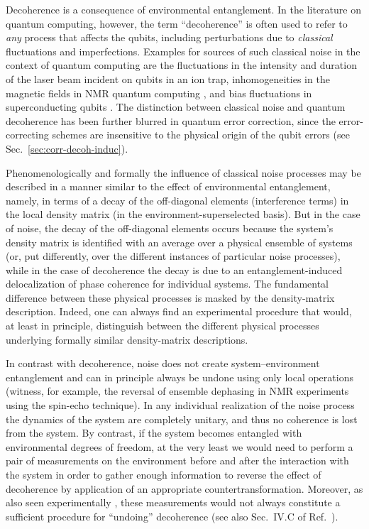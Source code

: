 \documentclass[aps,pra,reprint,amsmath,amssymb,showpacs,nofootinbib,floatfix,onecolumn,12pt]{revtex4-1}
\begin{document}
Decoherence is a consequence of environmental entanglement. In the literature on quantum computing, however, the term ``decoherence'' is often used to refer to \emph{any} process that affects the qubits, including perturbations due to \emph{classical} fluctuations and imperfections. Examples for sources of such classical noise in the context of quantum computing are the fluctuations in the intensity \cite{Schneider:1998:yz} and duration \cite{Miquel:1997:zz} of the laser beam incident on qubits in an ion trap, inhomogeneities in the magnetic fields in NMR quantum computing \cite{Vandersypen:2004:ra}, and bias fluctuations in superconducting qubits \cite{Martinis:2003:bz}. The distinction between classical noise and quantum decoherence has been further blurred in quantum error correction, since the error-correcting schemes are insensitive to the physical origin of the qubit errors (see Sec.~\ref{sec:corr-decoh-induc}).

Phenomenologically and formally the influence of classical noise processes may be described in a manner similar to the effect of environmental entanglement, namely, in terms of a decay of the off-diagonal elements (interference terms) in the local density matrix (in the environment-superselected basis). But in the case of noise, the decay of the off-diagonal elements occurs because the system's density matrix is identified with an average over a physical ensemble of systems (or, put differently, over the different instances of particular noise processes), while in the case of decoherence the decay is due to an entanglement-induced delocalization of phase coherence for individual systems. The fundamental difference between these physical processes is masked by the density-matrix description. Indeed, one can always find an experimental procedure that would, at least in principle, distinguish between the different physical processes underlying formally similar density-matrix descriptions.

In contrast with decoherence, noise does not create system--environment entanglement and can in principle always be undone using only local operations (witness, for example, the reversal of ensemble dephasing in NMR experiments using the spin-echo technique). In any individual realization of the noise process the dynamics of the system are completely unitary, and thus no coherence is lost from the system. By contrast, if the system becomes entangled with environmental degrees of freedom, at the very least we would need to perform a pair of measurements on the environment before and after the interaction with the system in order to gather enough information to reverse the effect of decoherence by application of an appropriate countertransformation. Moreover, as also seen experimentally \cite{Myatt:2000:yy}, these measurements would not always constitute a sufficient procedure for ``undoing'' decoherence (see also Sec.~IV.C of Ref.~\cite{Zurek:2002:ii}). 
\end{document}
